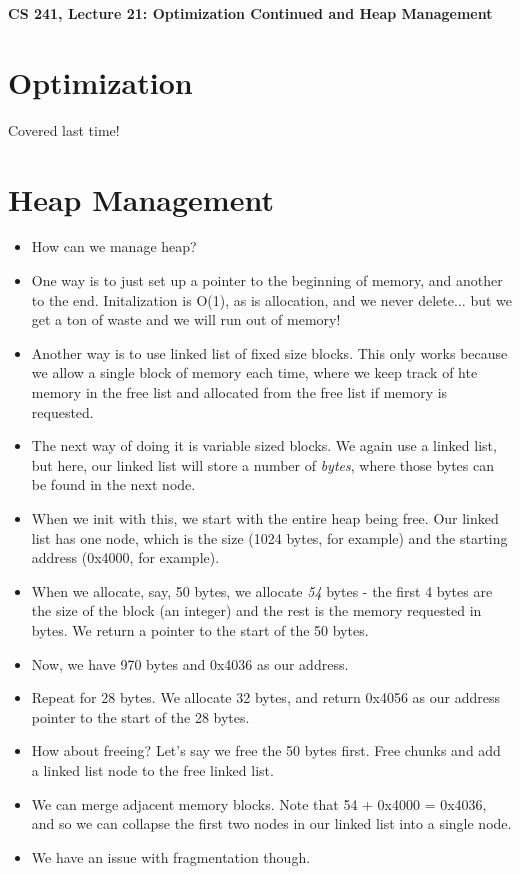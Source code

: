 \documentclass[12pt]{article}
\author{Clement Tsang}
\begin{document}
\begin{center}
\Large\textbf{CS 241, Lecture 21: Optimization Continued and Heap Management}
\end{center}

\section{Optimization}
Covered last time!

\section{Heap Management}
\begin{itemize}
    \item How can we manage heap?
    \item One way is to just set up a pointer to the beginning of memory, and another to the end.  Initalization is O(1), as is allocation, and we never delete$\dots$ but we get a ton of waste and we will run out of memory!
    \item Another way is to use linked list of fixed size blocks.  This only works because we allow a single block of memory each time, where we keep track of hte memory in the free list and allocated from the free list if memory is requested.
    \item The next way of doing it is variable sized blocks.  We again use a linked list, but here, our linked list will store a number of \emph{bytes}, where those bytes can be found in the next node.
    \item When we init with this, we start with the entire heap being free.  Our linked list has one node, which is the size (1024 bytes, for example) and the starting address (0x4000, for example).
    \item When we allocate, say, 50 bytes, we allocate \emph{54} bytes - the first 4 bytes are the size of the block (an integer) and the rest is the memory requested in bytes.  We return a pointer to the start of the 50 bytes.
    \item Now, we have 970 bytes and 0x4036 as our address.
    \item Repeat for 28 bytes.  We allocate 32 bytes, and return 0x4056 as our address pointer to the start of the 28 bytes.
    \item How about freeing?  Let's say we free the 50 bytes first. Free chunks and add a linked list node to the free linked list.
    \item We can merge adjacent memory blocks.  Note that 54 + 0x4000 = 0x4036, and so we can collapse the first two nodes in our linked list into a single node.
        \item We have an issue with fragmentation though.  
\end{itemize}
\end{document}
